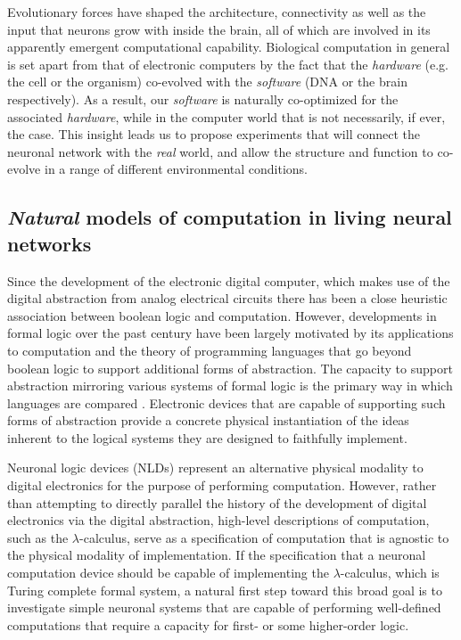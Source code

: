 Evolutionary forces have shaped the architecture, connectivity as well as the input that neurons grow with inside the brain, all of which are involved in its apparently emergent computational capability. Biological computation in general is set apart from that of electronic computers by the fact that the {\it hardware} (e.g. the cell or the organism) co-evolved with the {\it software} (DNA or the brain respectively). As a result, our {\it software} is naturally co-optimized for the associated {\it hardware}, while in the computer world that is not necessarily, if ever, the case. This insight leads us to propose experiments that will connect the neuronal network with the {\it real} world, and  allow the structure and function to co-evolve in a range of different environmental conditions.

\subsection{\emph{Natural} models of computation in living neural networks}

Since the development of the electronic digital computer, which makes
use of the digital abstraction \cite{Ward1989} from analog electrical circuits
there has been a close heuristic association between boolean logic and
computation. However, developments in formal logic over the past century
have been largely motivated by its applications to computation and the
theory of programming languages that go beyond boolean logic to support additional forms of abstraction. The capacity to support abstraction mirroring various systems of
formal logic is the primary way in which languages are compared \cite{Abelson1996}. Electronic devices that are capable
of supporting such forms of abstraction provide a concrete physical
instantiation of the ideas inherent to the logical systems they are
designed to faithfully implement.

Neuronal logic devices (NLDs) represent an alternative physical modality
to digital electronics for the purpose of performing computation.
However, rather than attempting to directly parallel the history of the
development of digital electronics via the digital abstraction,
high-level descriptions of computation, such as the
$\lambda$-calculus, serve as a specification
of computation that is agnostic to the physical modality of
implementation. If the specification that a neuronal computation device
should be capable of implementing the
$\lambda$-calculus, which is Turing complete formal system, a natural first step
toward this broad goal is to investigate simple neuronal systems that
are capable of performing well-defined computations that require a
capacity for first- or some higher-order logic.

